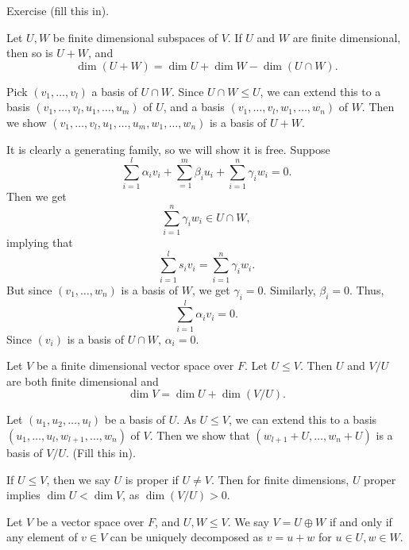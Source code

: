 \documentclass[12pt]{article}
\begin{document}
\begin{proofbox}
	Exercise (fill this in).
\end{proofbox}

\begin{proposition}
	Let $U, W$ be finite dimensional subspaces of $V$. If $U$ and $W$ are finite dimensional, then so is $U + W$, and
	\[
		\dim (U + W) = \dim U + \dim W - \dim(U \cap W)
	.\]
\end{proposition}

\begin{proofbox}
	Pick $(v_1, \ldots, v_l)$ a basis of $U \cap W$. Since $U \cap W \leq U$, we can extend this to a basis $(v_1, \ldots, v_l, u_1, \ldots, u_m)$ of $U$, and a basis $(v_1, \ldots, v_l, w_1, \ldots, w_n)$ of $W$. Then we show $(v_1, \ldots, v_l, u_1, \ldots, u_m, w_1, \ldots, w_n)$ is a basis of $U + W$.

	It is clearly a generating family, so we will show it is free. Suppose
	\[
		\sum_{i = 1}^{l} \alpha_i v_i + \sum_{ = 1}^{m} \beta_i u_i + \sum_{i = 1}^{n} \gamma_i w_i = 0
	.\]
	Then we get
	\[
	\sum_{i = 1}^{n} \gamma_i w_i \in U \cap W
	,\]
	implying that
	\[
	\sum_{i = 1}^{l} s_i v_i = \sum_{i = 1}^{n} \gamma_i w_i
	.\]
	But since $(v_1, \ldots, w_n)$ is a basis of $W$, we get $\gamma_i = 0$. Similarly, $\beta_i = 0$. Thus,
	\[
	\sum_{i = 1}^{l} \alpha_i v_i = 0
	.\]
	Since $(v_i)$ is a basis of $U \cap W$, $\alpha_i = 0$.
\end{proofbox}

\begin{proposition}
	Let $V$ be a finite dimensional vector space over $F$. Let $U \leq V$. Then $U$ and $V/U$ are both finite dimensional and
	\[
		\dim V = \dim U + \dim(V/U)
	.\]
\end{proposition}

\begin{proofbox}
	Let $(u_1, u_2, \ldots, u_l)$ be a basis of $U$. As $U \leq V$, we can extend this to a basis $(u_1, \ldots, u_l, w_{l+1}, \ldots, w_{n})$ of $V$. Then we show that $(w_{l+1} + U, \ldots, w_{n} + U)$ is a basis of $V/U$. (Fill this in).
\end{proofbox}

\begin{remark}
	If $U \leq V$, then we say $U$ is proper if $U \neq V$. Then for finite dimensions, $U$ proper implies $\dim U < \dim V$, as $\dim(V/U) > 0$.
\end{remark}

\begin{definition}
	Let $V$ be a vector space over $F$, and $U, W \leq V$. We say $V = U \oplus W$ if and only if any element of $v \in V$ can be uniquely decomposed as $v = u + w$ for $u \in U, w \in W$.
\end{definition}
\end{document}
